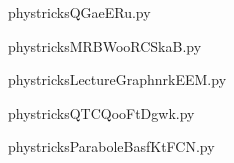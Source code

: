     

    \clearpage
    


    \newcommand{\CaptionFigQGaeERu}{<+Type your caption here+>}
    \begin{center}
        
    \end{center}
    phystricksQGaeERu.py

    

    \clearpage
    


    \newcommand{\CaptionFigMRBWooRCSkaB}{<+Type your caption here+>}
    \begin{center}
        
    \end{center}
    phystricksMRBWooRCSkaB.py

    

    \clearpage
    


    \newcommand{\CaptionFigLectureGraphnrkEEM}{<+Type your caption here+>}
    \begin{center}
        
    \end{center}
    phystricksLectureGraphnrkEEM.py

    

    \clearpage
    


    \newcommand{\CaptionFigQTCQooFtDgwk}{<+Type your caption here+>}
    \begin{center}
        
    \end{center}
    phystricksQTCQooFtDgwk.py

    

    \clearpage
    


    \newcommand{\CaptionFigParaboleBasfKtFCN}{<+Type your caption here+>}
    \begin{center}
        
    \end{center}
    phystricksParaboleBasfKtFCN.py

    

    \clearpage
    

